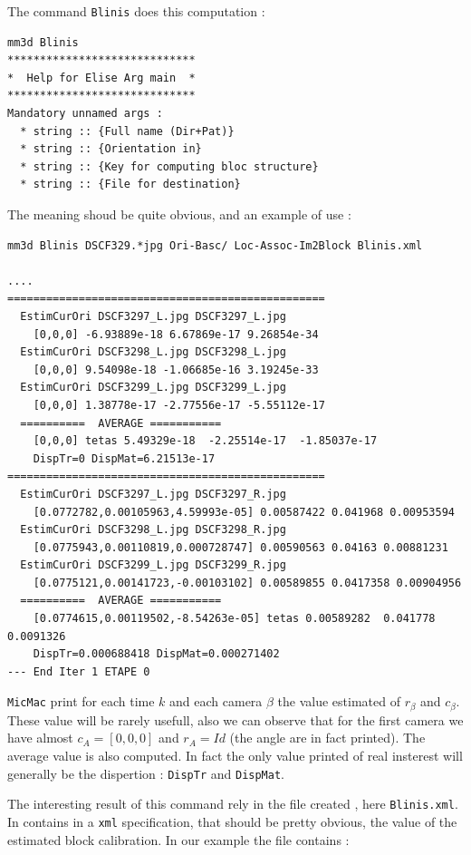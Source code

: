 The command {\tt Blinis} does this computation :

\begin{verbatim}
mm3d Blinis 
*****************************
*  Help for Elise Arg main  *
*****************************
Mandatory unnamed args : 
  * string :: {Full name (Dir+Pat)}
  * string :: {Orientation in}
  * string :: {Key for computing bloc structure}
  * string :: {File for destination}
\end{verbatim}


The meaning shoud be quite obvious, and an example of use :

\begin{verbatim}
mm3d Blinis DSCF329.*jpg Ori-Basc/ Loc-Assoc-Im2Block Blinis.xml

....
=================================================
  EstimCurOri DSCF3297_L.jpg DSCF3297_L.jpg
    [0,0,0] -6.93889e-18 6.67869e-17 9.26854e-34
  EstimCurOri DSCF3298_L.jpg DSCF3298_L.jpg
    [0,0,0] 9.54098e-18 -1.06685e-16 3.19245e-33
  EstimCurOri DSCF3299_L.jpg DSCF3299_L.jpg
    [0,0,0] 1.38778e-17 -2.77556e-17 -5.55112e-17
  ==========  AVERAGE =========== 
    [0,0,0] tetas 5.49329e-18  -2.25514e-17  -1.85037e-17
    DispTr=0 DispMat=6.21513e-17
=================================================
  EstimCurOri DSCF3297_L.jpg DSCF3297_R.jpg
    [0.0772782,0.00105963,4.59993e-05] 0.00587422 0.041968 0.00953594
  EstimCurOri DSCF3298_L.jpg DSCF3298_R.jpg
    [0.0775943,0.00110819,0.000728747] 0.00590563 0.04163 0.00881231
  EstimCurOri DSCF3299_L.jpg DSCF3299_R.jpg
    [0.0775121,0.00141723,-0.00103102] 0.00589855 0.0417358 0.00904956
  ==========  AVERAGE =========== 
    [0.0774615,0.00119502,-8.54263e-05] tetas 0.00589282  0.041778  0.0091326
    DispTr=0.000688418 DispMat=0.000271402
--- End Iter 1 ETAPE 0
\end{verbatim}

{\tt MicMac} print for each time $k$ and each camera $\beta$ the value estimated of 
$r_\beta$ and $c_\beta$.  These value will be rarely usefull, also we can observe that
for the first camera we have almost $c_A=[0,0,0]$ and $r_A=Id$ (the angle are 
in fact printed). The average value is also computed. In fact the only value printed
of real insterest will generally be the dispertion :  {\tt  DispTr} and {\tt DispMat}.

The interesting result of this command rely in the file created , here {\tt Blinis.xml}.
In contains in a {\tt xml} specification, that should be pretty obvious, the value
of the estimated block calibration.
In our example the file contains :


